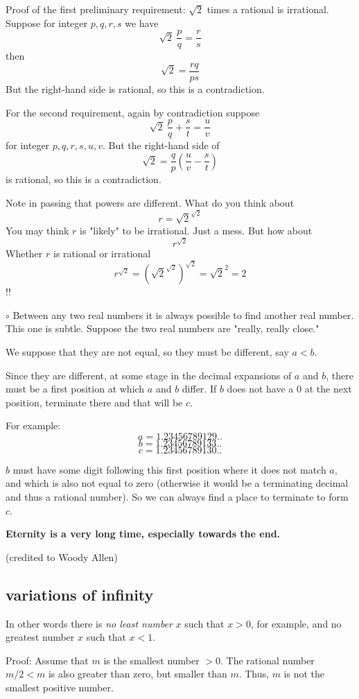 \documentclass[11pt, oneside]{article}
\begin{document}
Proof of the first preliminary requirement:  $\sqrt{2}$ times a rational is irrational.  Suppose for integer $p, q, r, s$ we have
\[ \sqrt{2} \ \frac{p}{q} = \frac{r}{s} \]
then
\[ \sqrt{2} = \frac{rq}{ps} \]
But the right-hand side is rational, so this is a contradiction.

For the second requirement, again by contradiction suppose
\[ \sqrt{2} \ \frac{p}{q} +  \frac{s}{t} = \frac{u}{v} \]
for integer $p, q, r, s, u, v$.  But the right-hand side of
\[ \sqrt{2} = \frac{q}{p} ( \frac{u}{v} - \frac{s}{t}) \]
is rational, so this is a contradiction.

Note in passing that powers are different.  What do you think about
\[ r = \sqrt{2}^{\sqrt{2}} \]
You may think $r$ is "likely" to be irrational.  Just a mess.  But how about
\[ r^{\sqrt{2}} \]
Whether $r$ is rational or irrational
\[ r^{\sqrt{2}} = (\sqrt{2}^{\sqrt{2}})^{\sqrt{2}} = \sqrt{2}^2 = 2 \]
!!

$\circ$  Between any two real numbers it is always possible to find another real number.  This one is subtle.  Suppose the two real numbers are "really, really close."  

We suppose that they are not equal, so they must be different, say $a < b$.

Since they are different, at some stage in the decimal expansions of $a$ and $b$, there must be a first position at which $a$ and $b$ differ.  If $b$ does not have a $0$ at the next position, terminate there and that will be $c$.

For example:
\[ a = 1.23456789129.. \]
\[ b = 1.23456789133.. \]
\[ c = 1.23456789130.. \]

$b$ must have some digit following this first position where it does not match $a$, and which is also not equal to zero (otherwise it would be a terminating decimal and thus a rational number).  So we can always find a place to terminate to form $c$.

\textbf{Eternity is a very long time, especially towards the end. }

(credited to Woody Allen)

\subsection*{variations of infinity}
In other words there is \emph{no least number} $x$ such that $x > 0$, for example, and no greatest number $x$ such that $x < 1$.  

Proof:  Assume that $m$ is the smallest number $> 0$.  The rational number $m/2 < m$ is also greater than zero, but smaller than $m$.  Thus, $m$ is not the smallest positive number.
\end{document}
